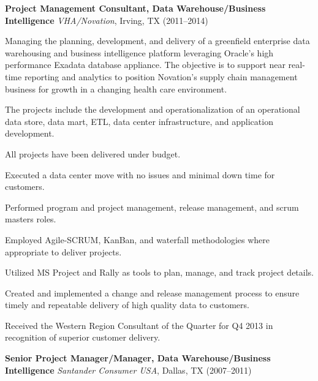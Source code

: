 \documentclass{article}
\newcommand{\sbt}{\,\begin{picture}(-1,1)(-1,-3)\circle*{3}\end{picture}\ }
\begin{document}
\clearpage

\noindent
{\bfseries Project Management Consultant, Data Warehouse/Business Intelligence} {\itshape VHA/Novation}, Irving, TX (2011--2014)
\begin{compactitem}

\item[\sbt] Managing the planning, development, and delivery of a greenfield enterprise data warehousing and business intelligence platform leveraging Oracle's high performance Exadata database appliance. The objective is to support near real-time reporting and analytics to position Novation's supply chain management business for growth in a changing health care environment.
\item[\sbt] The projects include the development and operationalization of an operational data store, data mart, ETL, data center infrastructure, and application development.
\item[\sbt] All projects have been delivered under budget.
\item[\sbt] Executed a data center move with no issues and minimal down time for customers.
\item[\sbt] Performed program and project management, release management, and scrum masters roles.
\item[\sbt] Employed Agile-SCRUM, KanBan, and waterfall methodologies where appropriate to deliver projects.
\item[\sbt] Utilized MS Project and Rally as tools to plan, manage, and track project details.
\item[\sbt] Created and implemented a change and release management process to ensure timely and repeatable delivery of high quality data to customers.
\item[\sbt] Received the Western Region Consultant of the Quarter for Q4 2013 in recognition of superior customer delivery.

\end{compactitem}

\smallskip

\noindent
{\bfseries Senior Project Manager/Manager, Data Warehouse/Business Intelligence} {\itshape Santander Consumer USA}, Dallas, TX (2007--2011)
\end{document}
